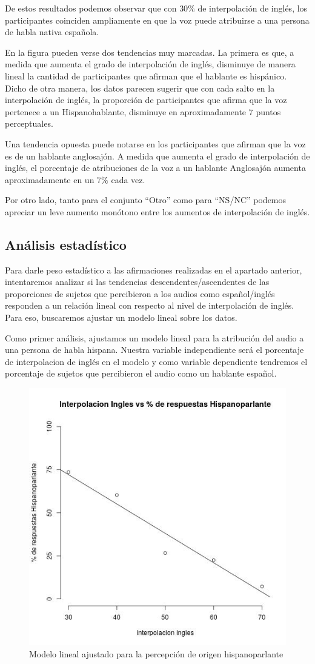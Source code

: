 De estos resultados podemos observar que con $30\%$ de interpolación de inglés, los participantes coinciden ampliamente en que la voz puede atribuirse a una persona de habla nativa española.

En la figura pueden verse dos tendencias muy marcadas. La primera es que, a medida que aumenta el grado de interpolación de inglés, disminuye de manera lineal la cantidad de participantes que afirman que el hablante es hispánico. Dicho de otra manera, los datos parecen sugerir que con cada salto en la interpolación de inglés, la proporción de participantes que afirma que la voz pertenece a un Hispanohablante, disminuye en aproximadamente $7$ puntos perceptuales. 

Una tendencia opuesta puede notarse en los participantes que afirman que la voz es de un hablante anglosajón. A medida que aumenta el grado de interpolación de inglés, el porcentaje de atribuciones de la voz a un hablante Anglosajón aumenta aproximadamente en un $7\%$ cada vez.

Por otro lado, tanto para el conjunto ``Otro'' como para ``NS/NC'' podemos apreciar un leve aumento monótono entre los aumentos de interpolación de inglés.

\subsection{Análisis estadístico}

Para darle peso estadístico a las afirmaciones realizadas en el apartado anterior, intentaremos analizar si las tendencias descendentes/ascendentes de las proporciones de sujetos que percibieron a los audios como español/inglés responden a un relación lineal con respecto al nivel de interpolación de inglés. Para eso, buscaremos ajustar un modelo lineal sobre los datos.

Como primer análisis, ajustamos un modelo lineal para la atribución del audio a una persona de habla hispana. Nuestra variable independiente será el porcentaje de interpolacion de inglés en el modelo y como variable dependiente tendremos el porcentaje de sujetos que percibieron el audio como un hablante español.

\begin{figure}
\begin{center}
\includegraphics[trim={0 0 0 1.5cm},clip,width=.5\textwidth]{imagenes/estadistica/spanish.jpg}
\end{center}
\caption{Modelo lineal ajustado para la percepción de origen hispanoparlante}
\label{stadisticSpanish}
\end{figure}

